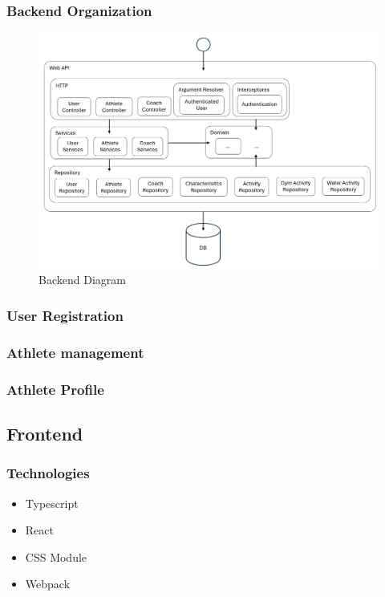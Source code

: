 \documentclass[a4paper,twoside,11pt]{article}
\begin{document}
\subsubsection{Backend Organization}
\begin{figure}[H]
\centering
\includegraphics[width=5in]{BackendDiagram.png}
\caption{Backend Diagram}
\end{figure}

\subsubsection{User Registration}
\subsubsection{Athlete management}
\subsubsection{Athlete Profile}

\subsection{Frontend}

\subsubsection{Technologies}
\begin{itemize}
\item Typescript
\item React
\item CSS Module
\item Webpack
\end{itemize}
\end{document}
